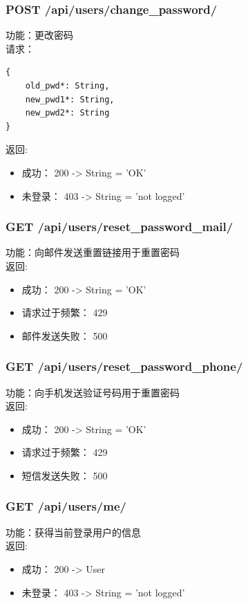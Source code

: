 \subsubsection{POST /api/users/change\_password/}

\noindent
功能：更改密码\\
请求：
\begin{lstlisting}[numbers=none, frame=none]
{
    old_pwd*: String,
    new_pwd1*: String,
    new_pwd2*: String
}
\end{lstlisting}
返回:
\begin{itemize}
	\item 成功： 200 -> String = 'OK'
	\item 未登录： 403 -> String = 'not logged'
\end{itemize}

\subsubsection{GET /api/users/reset\_password\_mail/}

\noindent
功能：向邮件发送重置链接用于重置密码\\
返回:
\begin{itemize}
	\item 成功： 200 -> String = 'OK'
	\item 请求过于频繁： 429
	\item 邮件发送失败： 500
\end{itemize}


\subsubsection{GET /api/users/reset\_password\_phone/}

\noindent
功能：向手机发送验证号码用于重置密码\\
返回:
\begin{itemize}
\item 成功： 200 -> String = 'OK'
\item 请求过于频繁： 429
\item 短信发送失败： 500
\end{itemize}



\subsubsection{GET /api/users/me/}

\noindent
功能：获得当前登录用户的信息\\
返回:
\begin{itemize}
	\item 成功： 200 -> User
	\item 未登录： 403 -> String = 'not logged'
\end{itemize}


